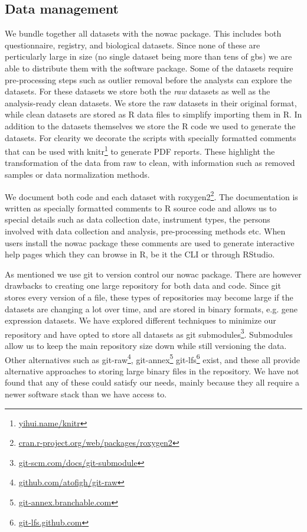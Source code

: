 \subsection{Data management} 
We bundle together all datasets with the \gls{nowac} package. This includes both
questionnaire, registry, and biological datasets. Since none of these are
perticularly large in size (no single dataset being more than tens of
\glspl{gb}) we are able to distribute them with the software package. Some of
the datasets require pre-processing steps such as outlier removal before the
analysts can explore the datasets. For these datasets we store both the
\emph{raw} datasets as well as the analysis-ready clean datasets. We store the
raw datasets in their original format, while clean datasets are stored as R data
files to simplify importing them in R. In addition to the datasets themselves we
store the R code we used to generate the datasets. For clearity we decorate the
scripts with specially formatted comments that can be used with
knitr\footnote{\url{yihui.name/knitr}} to generate PDF reports. These highlight
the transformation of the data from raw to clean, with information such as
removed samples or data normalization methods. 

We document both code and each dataset with
roxygen2\footnote{\url{cran.r-project.org/web/packages/roxygen2}}. The
documentation is written as specially formatted comments to R source code and
allows us to special details such as data collection date, instrument types, the
persons involved with data collection and analysis, pre-processing methods etc.
When users install the \gls{nowac} package these comments are used to generate
interactive help pages which they can browse in R, be it the CLI or through
RStudio. 

As mentioned we use git to version control our \gls{nowac} package. There are
however drawbacks to creating one large repository for both data and code. Since
git stores every version of a file, these types of repositories may become large
if the datasets are changing a lot over time, and are stored in binary formats,
e.g. gene expression datasets. We have explored different techniques to minimize
our repository and have opted to store all datasets as git
submodules\footnote{\url{git-scm.com/docs/git-submodule}}. Submodules allow us
to keep the main repository size down while still versioning the data. Other
alternatives such as git-raw\footnote{\url{github.com/atofigh/git-raw}},
git-annex\footnote{\url{git-annex.branchable.com}} 
git-lfs\footnote{\url{git-lfs.github.com}} exist, and these all provide
alternative approaches to storing large binary files in the repository. We have
not found that any of these could satisfy our needs, mainly because they all
require a newer software stack than we have access to.

